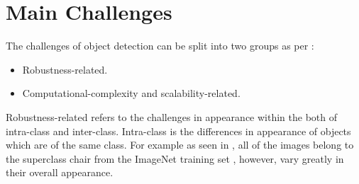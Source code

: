 \section{Main Challenges}
The challenges of object detection can be split into two groups as per \cite{zhang}:

\begin{itemize}
	\item Robustness-related.
	\item Computational-complexity and scalability-related.
\end{itemize}

Robustness-related refers to the challenges in appearance within the both of intra-class and inter-class. Intra-class is the differences in appearance of objects which are of the same class. For example as seen in , all of the images belong to the superclass chair from the ImageNet training set \cite{imagenet}, however, vary greatly in their overall appearance. 

